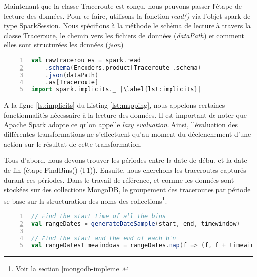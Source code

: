Maintenant que la classe Traceroute est conçu, nous pouvons passer l'étape de lecture des données. Pour ce faire, utilisons la fonction \textit{read()} via l'objet spark de type SparkSession. Nous spécifions à la méthode le schéma de lecture à travers la classe Traceroute, le chemin vers les fichiers de données (\textit{dataPath}) et comment elles sont structurées les données (\textit{json})
\begin{lstlisting}[language=scala,firstnumber=1, caption={Le mapping entre données et cas class},label={lst:mapping}, basicstyle = \footnotesize,escapechar=|,numbers=left,
stepnumber=1]
val rawtraceroutes = spark.read
	.schema(Encoders.product[Traceroute].schema)
	.json(dataPath)
	.as[Traceroute]
import spark.implicits._ |\label{lst:implicits}|
 \end{lstlisting}

A la ligne \ref{lst:implicits} du Listing \ref{lst:mapping}, nous appelons certaines fonctionnalités nécessaire à la lecture des données. Il est important de noter que Apache Spark adopte ce qu'on appelle \textit{lazy evaluation}. Ainsi, l'évaluation des différentes transformations ne s'effectuent qu'au moment du déclenchement d'une action sur le résultat de cette transformation.

Tous d'abord, nous devons trouver les périodes entre la date de début et la date de fin (étape FindBins()  (I.1)).  Ensuite, nous cherchons les traceroutes capturés durant ces périodes. 
Dans le travail de référence, et comme les données sont stockées sur des collections MongoDB, le groupement des traceroutes par période se base sur la structuration des noms des collections\footnote{Voir la section \ref{mongodb-impleme}.}. 

\begin{lstlisting}[language=scala,firstnumber=1, caption={étape FindBins()  (I.1)},label={lst:findbins}, basicstyle = \footnotesize,escapechar=|,numbers=left,
stepnumber=1]
// Find the start time of all the bins 
val rangeDates = generateDateSample(start, end, timewindow)

// Find the start and the end of each bin
val rangeDatesTimewindows = rangeDates.map(f => (f, f + timewindow))
\end{lstlisting}
